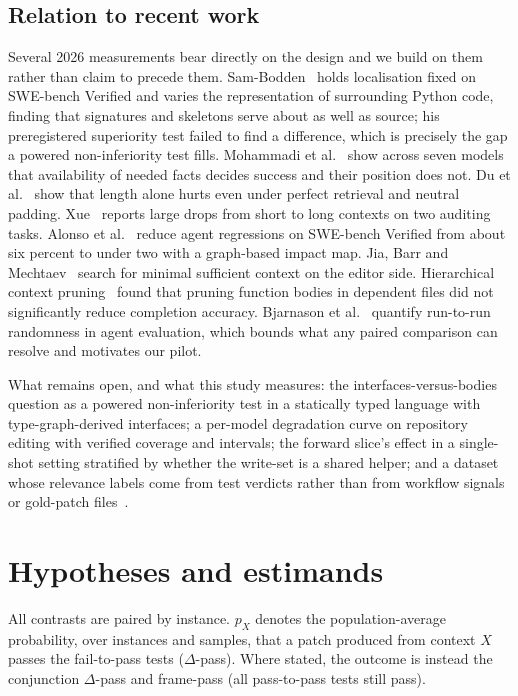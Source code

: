 \documentclass[10pt,conference]{IEEEtran}
\begin{document}
\subsection{Relation to recent work}

Several 2026 measurements bear directly on the design and we build on them rather than claim to precede them. Sam-Bodden~\cite{sambodden2026context} holds localisation fixed on SWE-bench Verified and varies the representation of surrounding Python code, finding that signatures and skeletons serve about as well as source; his preregistered superiority test failed to find a difference, which is precisely the gap a powered non-inferiority test fills. Mohammadi et al.~\cite{mohammadi2026workingset} show across seven models that availability of needed facts decides success and their position does not. Du et al.~\cite{du2025length} show that length alone hurts even under perfect retrieval and neutral padding. Xue~\cite{xue2026contextrot} reports large drops from short to long contexts on two auditing tasks. Alonso et al.~\cite{alonso2026tdad} reduce agent regressions on SWE-bench Verified from about six percent to under two with a graph-based impact map. Jia, Barr and Mechtaev~\cite{jia2026compressing} search for minimal sufficient context on the editor side. Hierarchical context pruning~\cite{zhang2024hcp} found that pruning function bodies in dependent files did not significantly reduce completion accuracy. Bjarnason et al.~\cite{bjarnason2026randomness} quantify run-to-run randomness in agent evaluation, which bounds what any paired comparison can resolve and motivates our pilot.

What remains open, and what this study measures: the interfaces-versus-bodies question as a powered non-inferiority test in a statically typed language with type-graph-derived interfaces; a per-model degradation curve on repository editing with verified coverage and intervals; the forward slice's effect in a single-shot setting stratified by whether the write-set is a shared helper; and a dataset whose relevance labels come from test verdicts rather than from workflow signals or gold-patch files~\cite{qin2026agentretrieval,li2026contextbench}.

\section{Hypotheses and estimands}

All contrasts are paired by instance. $p_X$ denotes the population-average probability, over instances and samples, that a patch produced from context $X$ passes the fail-to-pass tests ($\Delta$-pass). Where stated, the outcome is instead the conjunction $\Delta$-pass and frame-pass (all pass-to-pass tests still pass).
\end{document}
